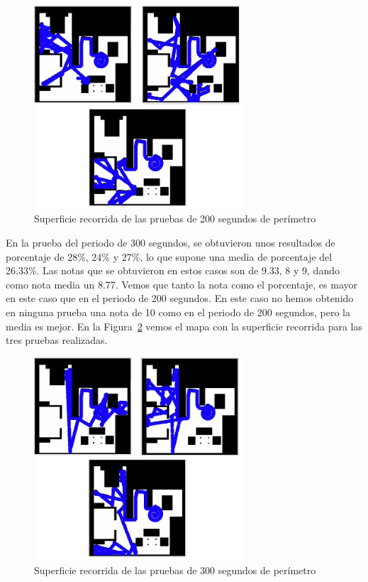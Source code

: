 \begin{figure}[H]
  \begin{center}
    \includegraphics[width=0.7\textwidth]{figures/Vacuum/Referee200.png}
		\caption{Superficie recorrida de las pruebas de 200 segundos de perímetro}
		\label{fig.Referee200}
		\end{center}
\end{figure}

En la prueba del periodo de 300 segundos, se obtuvieron unos resultados de porcentaje de 28\%, 24\% y 27\%, lo que supone una media de porcentaje del 26.33\%. Las notas que se obtuvieron en estos casos son de 9.33, 8 y 9, dando como nota media un 8.77. Vemos que tanto la nota como el porcentaje, es mayor en este caso que en el periodo de 200 segundos. En este caso no hemos obtenido en ninguna prueba una nota de 10 como en el periodo de 200 segundos, pero la media es mejor. En la Figura~\ref{fig.Referee300} vemos el mapa con la superficie recorrida para las tres pruebas realizadas.

\begin{figure}[H]
  \begin{center}
    \includegraphics[width=0.7\textwidth]{figures/Vacuum/Referee300.png}
		\caption{Superficie recorrida de las pruebas de 300 segundos de perímetro}
		\label{fig.Referee300}
		\end{center}
\end{figure}

